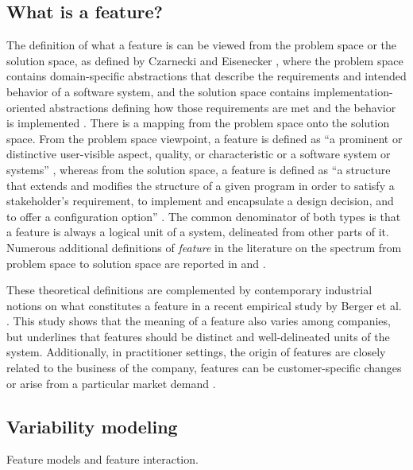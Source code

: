 \subsection{What is a feature?}
The definition of what a feature is can be viewed from the problem space or the solution space, as defined by Czarnecki and Eisenecker \cite{czarnecki2000generative}, where the problem space contains domain-specific abstractions that describe the requirements  and intended behavior of a software system, and the solution space contains implementation-oriented abstractions defining how those requirements are met and the behavior is implemented \cite{apel2009overview}. There is a mapping from the problem space onto the solution space. From the problem space viewpoint, a feature is defined as ``a prominent or distinctive user-visible aspect, quality, or characteristic or a software system or systems'' \cite{kang1990feature}, whereas from the solution space, a feature is defined as ``a structure that extends and modifies the structure of a given program in order to satisfy a stakeholder's requirement, to implement and encapsulate a design decision, and to offer a configuration option'' \cite{apel2008algebra}.
The common denominator of both types is that a feature is always a logical unit of a system, delineated from other parts of it. Numerous additional definitions of \textit{feature} in the literature on the spectrum from problem space to solution space are reported in \cite{apel2009overview} and \cite{berger2015feature}.

These theoretical definitions are complemented by contemporary industrial notions on what constitutes a feature in a recent empirical study by Berger et al. \cite{berger2015feature}. This study shows that the meaning of a feature also varies among companies, but underlines that features should be distinct and well-delineated units of the system. Additionally, in practitioner settings, the origin of features are closely related to the business of the company, features can be customer-specific changes or arise from a particular market demand \cite{berger2015feature}.

\subsection{Variability modeling}
Feature models and feature interaction.

